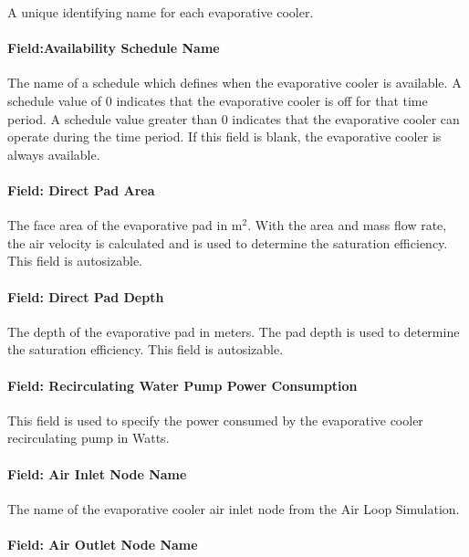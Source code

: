 A unique identifying name for each evaporative cooler.

\paragraph{Field:Availability Schedule Name}\label{fieldavailability-schedule-name}

The name of a schedule which defines when the evaporative cooler is available. A schedule value of 0 indicates that the evaporative cooler is off for that time period. A schedule value greater than 0 indicates that the evaporative cooler can operate during the time period. If this field is blank, the evaporative cooler is always available.

\paragraph{Field: Direct Pad Area}\label{field-direct-pad-area}

The face area of the evaporative pad in m\(^{2}\). With the area and mass flow rate, the air velocity is calculated and is used to determine the saturation efficiency. This field is autosizable.

\paragraph{Field: Direct Pad Depth}\label{field-direct-pad-depth}

The depth of the evaporative pad in meters. The pad depth is used to determine the saturation efficiency. This field is autosizable.

\paragraph{Field: Recirculating Water Pump Power Consumption}\label{field-recirculating-water-pump-power-consumption}

This field is used to specify the power consumed by the evaporative cooler recirculating pump in Watts.

\paragraph{Field: Air Inlet Node Name}\label{field-air-inlet-node-name-001}

The name of the evaporative cooler air inlet node from the Air Loop Simulation.

\paragraph{Field: Air Outlet Node Name}\label{field-air-outlet-node-name-001}

